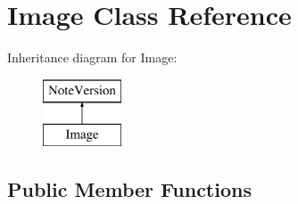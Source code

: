 \hypertarget{class_image}{}\section{Image Class Reference}
\label{class_image}
Inheritance diagram for Image\+:\begin{figure}[H]
\begin{center}
\leavevmode
\includegraphics[height=2.000000cm]{class_image}
\end{center}
\end{figure}
\subsection*{Public Member Functions}
